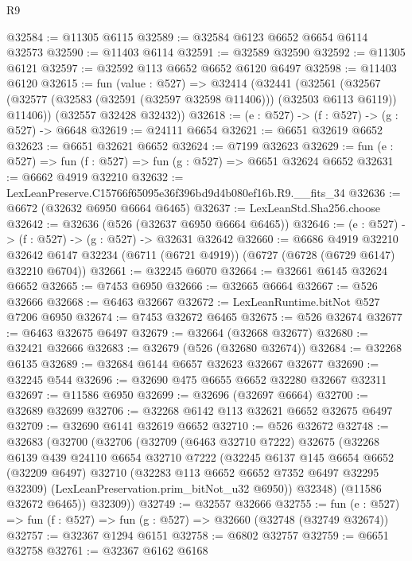 \begin{lexlean}{R9}
\begin{coremodule}
@32584 := @11305 @6115
@32589 := @32584 @6123 @6652 @6654 @6114 @32573
@32590 := @11403 @6114
@32591 := @32589 @32590
@32592 := @11305 @6121
@32597 := @32592 @113 @6652 @6652 @6120 @6497
@32598 := @11403 @6120
@32615 := fun (value : @527) =>
  @32414
    (@32441
      (@32561
        (@32567 (@32577 (@32583 (@32591 (@32597 @32598 @11406))) (@32503 @6113 @6119)) @11406))
      (@32557 @32428 @32432))
@32618 := (e : @527) -> (f : @527) -> (g : @527) -> @6648
@32619 := @24111 @6654
@32621 := @6651 @32619 @6652
@32623 := @6651 @32621 @6652
@32624 := @7199 @32623
@32629 := fun (e : @527) => fun (f : @527) => fun (g : @527) => @6651 @32624 @6652
@32631 := @6662 @4919 @32210
@32632 := LexLeanPreserve.C15766f65095e36f396bd9d4b080ef16b.R9.__fits_34
@32636 := @6672 (@32632 @6950 @6664 @6465)
@32637 := LexLeanStd.Sha256.choose
@32642 := @32636 (@526 (@32637 @6950 @6664 @6465))
@32646 := (e : @527) -> (f : @527) -> (g : @527) -> @32631 @32642
@32660 := @6686
    @4919
    @32210
    @32642
    @6147
    @32234
    (@6711 (@6721 @4919))
    (@6727 (@6728 (@6729 @6147) @32210 @6704))
@32661 := @32245 @6070
@32664 := @32661 @6145 @32624 @6652
@32665 := @7453 @6950
@32666 := @32665 @6664
@32667 := @526 @32666
@32668 := @6463 @32667
@32672 := LexLeanRuntime.bitNot @527 @7206 @6950
@32674 := @7453 @32672 @6465
@32675 := @526 @32674
@32677 := @6463 @32675 @6497
@32679 := @32664 (@32668 @32677)
@32680 := @32421 @32666
@32683 := @32679 (@526 (@32680 @32674))
@32684 := @32268 @6135
@32689 := @32684 @6144 @6657 @32623 @32667 @32677
@32690 := @32245 @544
@32696 := @32690 @475 @6655 @6652 @32280 @32667 @32311
@32697 := @11586 @6950
@32699 := @32696 (@32697 @6664)
@32700 := @32689 @32699
@32706 := @32268 @6142 @113 @32621 @6652 @32675 @6497
@32709 := @32690 @6141 @32619 @6652
@32710 := @526 @32672
@32748 := @32683
    (@32700
      (@32706
        (@32709
          (@6463 @32710 @7222)
          @32675
          (@32268
            @6139
            @439
            @24110
            @6654
            @32710
            @7222
            (@32245
              @6137
              @145
              @6654
              @6652
              (@32209 @6497)
              @32710
              (@32283 @113 @6652 @6652 @7352 @6497 @32295 @32309)
              (LexLeanPreservation.prim_bitNot_u32 @6950))
            @32348)
          (@11586 @32672 @6465))
        @32309))
@32749 := @32557 @32666
@32755 := fun (e : @527) => fun (f : @527) => fun (g : @527) => @32660 (@32748 (@32749 @32674))
@32757 := @32367 @1294 @6151
@32758 := @6802 @32757
@32759 := @6651 @32758
@32761 := @32367 @6162 @6168

\end{coremodule}
\end{lexlean}

